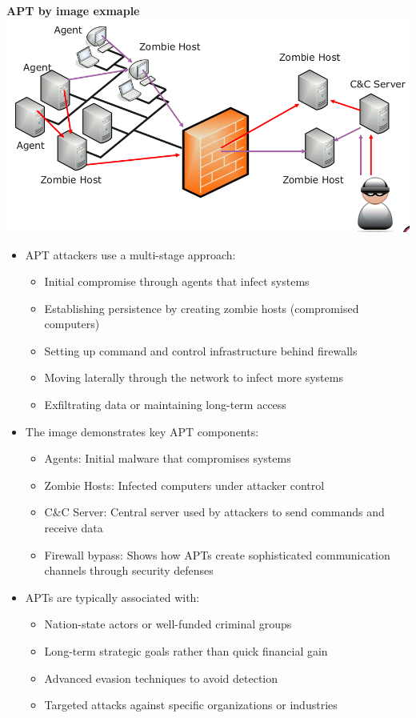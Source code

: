 \textbf{APT by image exmaple}
\includegraphics[scale=0.2]{resources/02-apt-01.png}
\begin{itemize}
    \item APT attackers use a multi-stage approach:
    \begin{itemize}
        \tightlist
        \item Initial compromise through agents that infect systems
        \item Establishing persistence by creating zombie hosts (compromised computers)
        \item Setting up command and control infrastructure behind firewalls
        \item Moving laterally through the network to infect more systems
        \item Exfiltrating data or maintaining long-term access
    \end{itemize}

    \item The image demonstrates key APT components:
    \begin{itemize}
        \tightlist
        \item Agents: Initial malware that compromises systems
        \item Zombie Hosts: Infected computers under attacker control
        \item C\&C Server: Central server used by attackers to send commands and receive data
        \item Firewall bypass: Shows how APTs create sophisticated communication channels through security defenses
    \end{itemize}

    \item APTs are typically associated with:
    \begin{itemize}
        \tightlist
        \item Nation-state actors or well-funded criminal groups
        \item Long-term strategic goals rather than quick financial gain
        \item Advanced evasion techniques to avoid detection
        \item Targeted attacks against specific organizations or industries
    \end{itemize}
\end{itemize}

